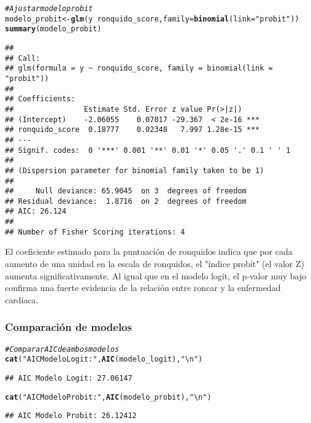 \documentclass[paper=letter, fontsize=11pt, draft=false]{scrartcl}\usepackage[]{graphicx}\usepackage[]{xcolor}
\makeatletter
\newcommand{\hlsng}[1]{\textcolor[rgb]{0.192,0.494,0.8}{#1}}%
\newcommand{\hlcom}[1]{\textcolor[rgb]{0.678,0.584,0.686}{\textit{#1}}}%
\newcommand{\hlopt}[1]{\textcolor[rgb]{0,0,0}{#1}}%
\newcommand{\hldef}[1]{\textcolor[rgb]{0.345,0.345,0.345}{#1}}%
\newcommand{\hlkwb}[1]{\textcolor[rgb]{0.69,0.353,0.396}{#1}}%
\newcommand{\hlkwc}[1]{\textcolor[rgb]{0.333,0.667,0.333}{#1}}%
\newcommand{\hlkwd}[1]{\textcolor[rgb]{0.737,0.353,0.396}{\textbf{#1}}}%
\newenvironment{kframe}{%
 \def\at@end@of@kframe{}%
 \ifinner\ifhmode%
  \def\at@end@of@kframe{\end{minipage}}%
  \begin{minipage}{\columnwidth}%
 \fi\fi%
 \def\FrameCommand##1{\hskip\@totalleftmargin \hskip-\fboxsep
 \colorbox{shadecolor}{##1}\hskip-\fboxsep
     \hskip-\linewidth \hskip-\@totalleftmargin \hskip\columnwidth}%
 \MakeFramed {\advance\hsize-\width
   \@totalleftmargin\z@ \linewidth\hsize
   \@setminipage}}%
 {\par\unskip\endMakeFramed%
 \at@end@of@kframe}
\newenvironment{knitrout}{}{} %
\numberwithin{equation}{problemcounter} %
\numberwithin{figure}{problemcounter} %
\numberwithin{table}{problemcounter} %
\numberwithin{subsection}{problemcounter}
\makeatother
\begin{document}
\begin{knitrout}
\color{fgcolor}\begin{kframe}
\begin{alltt}
\hlcom{# Ajustar modelo probit}
\hldef{modelo_probit} \hlkwb{<-} \hlkwd{glm}\hldef{(y} \hlopt{~} \hldef{ronquido_score,} \hlkwc{family} \hldef{=} \hlkwd{binomial}\hldef{(}\hlkwc{link} \hldef{=} \hlsng{"probit"}\hldef{))}
\hlkwd{summary}\hldef{(modelo_probit)}
\end{alltt}
\begin{verbatim}
## 
## Call:
## glm(formula = y ~ ronquido_score, family = binomial(link = "probit"))
## 
## Coefficients:
##                Estimate Std. Error z value Pr(>|z|)    
## (Intercept)    -2.06055    0.07017 -29.367  < 2e-16 ***
## ronquido_score  0.18777    0.02348   7.997 1.28e-15 ***
## ---
## Signif. codes:  0 '***' 0.001 '**' 0.01 '*' 0.05 '.' 0.1 ' ' 1
## 
## (Dispersion parameter for binomial family taken to be 1)
## 
##     Null deviance: 65.9045  on 3  degrees of freedom
## Residual deviance:  1.8716  on 2  degrees of freedom
## AIC: 26.124
## 
## Number of Fisher Scoring iterations: 4
\end{verbatim}
\end{kframe}
\end{knitrout}

El coeficiente estimado para la puntuación de ronquidos indica que por cada aumento de una unidad en la escala de ronquidos, el "índice probit" (el valor Z) aumenta significativamente. Al igual que en el modelo logit, el p-valor muy bajo confirma una fuerte evidencia de la relación entre roncar y la enfermedad cardíaca.

\subsubsection*{Comparación de modelos}

\begin{knitrout}
\color{fgcolor}\begin{kframe}
\begin{alltt}
\hlcom{# Comparar AIC de ambos modelos}
\hlkwd{cat}\hldef{(}\hlsng{"AIC Modelo Logit:"}\hldef{,} \hlkwd{AIC}\hldef{(modelo_logit),} \hlsng{"\textbackslash{}n"}\hldef{)}
\end{alltt}
\begin{verbatim}
## AIC Modelo Logit: 27.06147
\end{verbatim}
\begin{alltt}
\hlkwd{cat}\hldef{(}\hlsng{"AIC Modelo Probit:"}\hldef{,} \hlkwd{AIC}\hldef{(modelo_probit),} \hlsng{"\textbackslash{}n"}\hldef{)}
\end{alltt}
\begin{verbatim}
## AIC Modelo Probit: 26.12412
\end{verbatim}
\end{kframe}
\end{knitrout}
\end{document}

